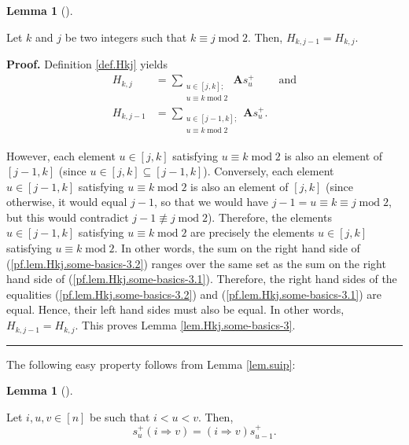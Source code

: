 \documentclass[numbers=enddot,12pt,final,onecolumn,notitlepage]{scrartcl}%
\theoremstyle{definition}
\newtheorem{lem}[theo]{Lemma}
\newenvironment{lemma}[1][]
{\begin{lem}[#1]\begin{leftbar}}
{\end{leftbar}\end{lem}}
\newenvironment{proof}[1][Proof]{\noindent\textbf{#1.} }{\ \rule{0.5em}{0.5em}}
\let\sumnonlimits\sum
\renewcommand{\sum}{\sumnonlimits\limits}
\begin{document}
\begin{lemma}
\label{lem.Hkj.some-basics-3}Let $k$ and $j$ be two integers such that
$k\equiv j\operatorname{mod}2$. Then, $H_{k,j-1}=H_{k,j}$.
\end{lemma}

\begin{proof}
Definition \ref{def.Hkj} yields%
\begin{align}
H_{k,j}  &  =\sum_{\substack{u\in\left[  j,k\right]  ;\\u\equiv
k\operatorname{mod}2}}\mathbf{A}s_{u}^{+}\ \ \ \ \ \ \ \ \ \ \text{and}%
\label{pf.lem.Hkj.some-basics-3.1}\\
H_{k,j-1}  &  =\sum_{\substack{u\in\left[  j-1,k\right]  ;\\u\equiv
k\operatorname{mod}2}}\mathbf{A}s_{u}^{+}. \label{pf.lem.Hkj.some-basics-3.2}%
\end{align}


However, each element $u\in\left[  j,k\right]  $ satisfying $u\equiv
k\operatorname{mod}2$ is also an element of $\left[  j-1,k\right]  $ (since
$u\in\left[  j,k\right]  \subseteq\left[  j-1,k\right]  $). Conversely, each
element $u\in\left[  j-1,k\right]  $ satisfying $u\equiv k\operatorname{mod}2$
is also an element of $\left[  j,k\right]  $ (since otherwise, it would equal
$j-1$, so that we would have $j-1=u\equiv k\equiv j\operatorname{mod}2$, but
this would contradict $j-1\not \equiv j\operatorname{mod}2$). Therefore, the
elements $u\in\left[  j-1,k\right]  $ satisfying $u\equiv k\operatorname{mod}%
2$ are precisely the elements $u\in\left[  j,k\right]  $ satisfying $u\equiv
k\operatorname{mod}2$. In other words, the sum on the right hand side of
(\ref{pf.lem.Hkj.some-basics-3.2}) ranges over the same set as the sum on the
right hand side of (\ref{pf.lem.Hkj.some-basics-3.1}). Therefore, the right
hand sides of the equalities (\ref{pf.lem.Hkj.some-basics-3.2}) and
(\ref{pf.lem.Hkj.some-basics-3.1}) are equal. Hence, their left hand sides
must also be equal. In other words, $H_{k,j-1}=H_{k,j}$. This proves Lemma
\ref{lem.Hkj.some-basics-3}.
\end{proof}

The following easy property follows from Lemma \ref{lem.suip}:

\begin{lemma}
\label{lem.su+ip}Let $i,u,v\in\left[  n\right]  $ be such that $i<u<v$. Then,%
\[
s_{u}^{+}\left(  i\Longrightarrow v\right)  =\left(  i\Longrightarrow
v\right)  s_{u-1}^{+}.
\]

\end{lemma}
\end{document}
